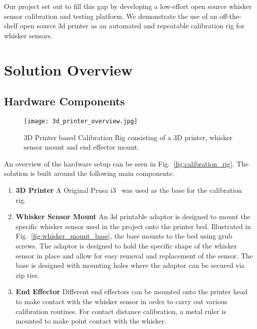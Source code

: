 \documentclass[runningheads]{llncs}
\begin{document}
Our project set out to fill this gap by developing a low-effort open source whisker sensor calibration and testing platform. We demonstrate the use of an off-the-shelf open source 3d printer as an automated and repeatable calibration rig for whisker sensors.

\section{Solution Overview}

\subsection{Hardware Components}

\begin{wrapfigure}{r}{0.5\textwidth}
    \centering
    \texttt{[image: 3d\_printer\_overview.jpg]}
    \caption{3D Printer based Calibration Rig consisting of a 3D printer, whisker sensor mount and end effector mount.}
    \label{fig:calibration_rig_overview}
\end{wrapfigure}

An overview of the hardware setup can be seen in Fig.~\ref{fig:calibration_rig}. The solution is built around the following main components:

\begin{enumerate}
    \item \textbf{3D Printer} A Original Prusa i3~\cite{OriginalPrusaI3} was used as the base for the calibration rig.
    \item \textbf{Whisker Sensor Mount} An 3d printable adaptor is designed to mount the specific whisker sensor used in the project onto the printer bed. Illustrated in Fig.~\ref{fig:whisker_mount_base}, the base mounts to the bed using grub screws. The adaptor is designed to hold the specific shape of the whisker sensor in place and allow for easy removal and replacement of the sensor. The base is designed with mounting holes where the adaptor can be secured via zip ties.
    \item \textbf{End Effector} Different end effectors can be mounted onto the printer head to make contact with the whisker sensor in order to carry out various calibration routines. For contact distance calibration, a metal ruler is mounted to make point contact with the whisker.
\end{enumerate}
\end{document}
